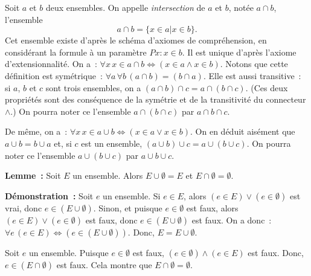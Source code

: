 Soit $a$ et $b$ deux ensembles. 
On appelle \textit{intersection} de $a$ et $b$, notée $a \cap b$, l'ensemble 
\begin{equation*}
    a \cap b = \lbrace x \in a \vert x \in b \rbrace. 
\end{equation*}
Cet ensemble existe d'après le schéma d'axiomes de compréhension, en considérant la formule à un paramètre $P x: x \in b$. 
Il est unique d'après l'axiome d'extensionnalité.
On a : $\forall x \, x \in a \cap b \Leftrightarrow (x \in a \wedge x \in b)$. 
Notons que cette définition est symétrique : $\forall a \, \forall b \, (a \cap b) = (b \cap a)$.  
Elle est aussi transitive : si $a$, $b$ et $c$ sont trois ensembles, on a $(a \cap b) \cap c = a \cap (b \cap c)$. 
(Ces deux propriétés sont des conséquence de la symétrie et de la transitivité du connecteur $\wedge$.)
On pourra noter ce l'ensemble $a \cap (b \cap c)$ par $a \cap b \cap c$. 

De même, on a : $\forall x \, x \in a \cup b \Leftrightarrow (x \in a \vee x \in b)$. 
On en déduit aisément que $a \cup b = b \cup a$ et, si $c$ est un ensemble, $(a \cup b) \cup c = a \cup (b \cup c)$. 
On pourra noter ce l'ensemble $a \cup (b \cup c)$ par $a \cup b \cup c$. 

\medskip

\noindent\textbf{Lemme :} Soit $E$ un ensemble. 
    Alors $E \cup \emptyset = E$ et $E \cap \emptyset = \emptyset$.

\medskip

\noindent\textbf{Démonstration :} 
    Soit $e$ un ensemble. 
    Si $e \in E$, alors $(e \in E) \vee (e \in \emptyset)$  est vrai, donc $e \in (E \cup \emptyset)$.
    Sinon, et puisque $e \in \emptyset$ est faux, alors $(e \in E) \vee (e \in \emptyset)$  est faux, donc $e \in (E \cup \emptyset)$ est faux.
    On a donc : $\forall e \, (e \in E) \Leftrightarrow (e \in (E \cup \emptyset))$.
    Donc, $E = E \cup \emptyset$.

    Soit $e$ un ensemble. 
    Puisque $e \in \emptyset$ est faux, $(e \in \emptyset) \wedge (e \in E)$ est faux. 
    Donc, $e \in (E \cap \emptyset)$ est faux.
    Cela montre que $E \cap \emptyset = \emptyset$.

    \done

\medskip

